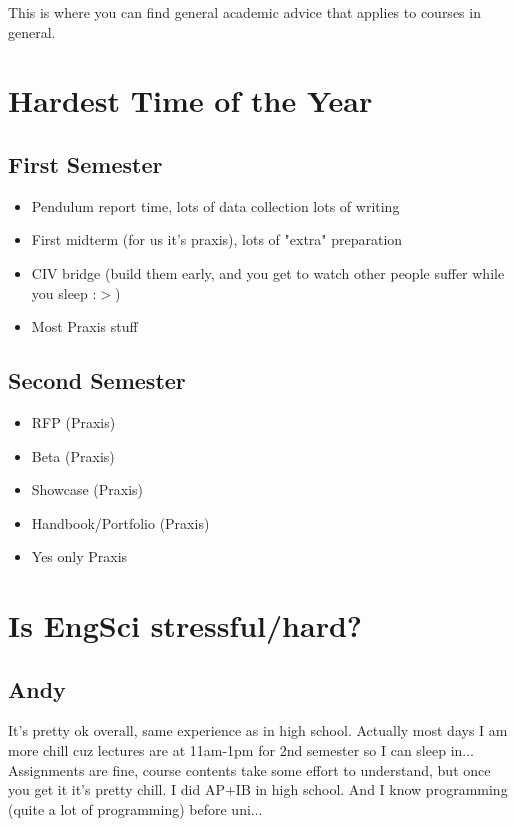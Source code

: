 This is where you can find general academic advice that applies to courses in general.

\section{Hardest Time of the Year}

\subsection{First Semester}
\begin{itemize}
    \item Pendulum report time, lots of data collection lots of writing
    \item First midterm (for us it's praxis), lots of "extra" preparation
    \item CIV bridge (build them early, and you get to watch other people suffer while you sleep :$>$)
    \item Most Praxis stuff
\end{itemize}

\subsection{Second Semester}
\begin{itemize}
    \item RFP (Praxis)
    \item Beta (Praxis)
    \item Showcase (Praxis)
    \item Handbook/Portfolio (Praxis)
    \item Yes only Praxis
\end{itemize}

\section{Is EngSci stressful/hard?}

\subsection{Andy}

It's pretty ok overall, same experience as in high school. Actually most days I am more chill cuz lectures are at 11am-1pm for 2nd semester so I can sleep in... Assignments are fine, course contents take some effort to understand, but once you get it it's pretty chill. I did AP+IB in high school. And I know programming (quite a lot of programming) before uni...

